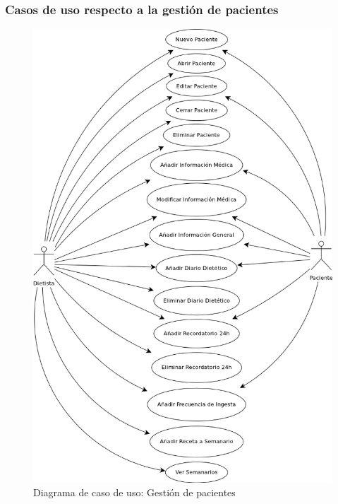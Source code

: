 \subsubsection{Casos de uso respecto a la gestión de pacientes}
\begin{figure}[H]
  \label{cu_paciente}
  \begin{center}
    \includegraphics[scale=0.6]{../img/CU_Paciente.png}
  \end{center}
  \caption{Diagrama de caso de uso: Gestión de pacientes}
\end{figure}

